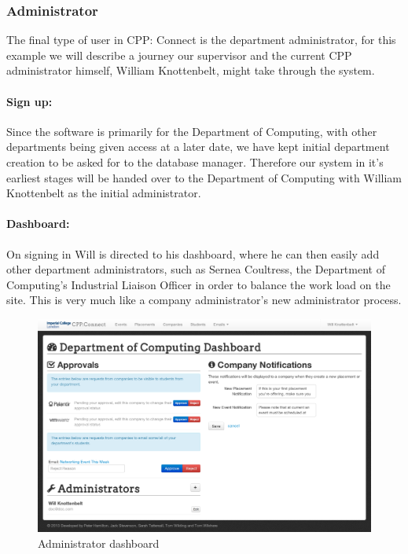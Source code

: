 \subsubsection{Administrator}
  The final type of user in CPP: Connect is the department administrator, for this example we will describe a journey our supervisor and the current CPP administrator himself, William Knottenbelt, might take through the system.
  \paragraph{Sign up:}
    Since the software is primarily for the Department of Computing, with other departments being given access at a later date, we have kept initial department creation to be asked for to the database manager. 
    Therefore our system in it's earliest stages will be handed over to the Department of Computing with William Knottenbelt as the initial administrator.

  \paragraph{Dashboard:}
    On signing in Will is directed to his dashboard, where he can then easily add other department administrators, such as Sernea Coultress, the Department of Computing's Industrial Liaison Officer in order to balance the work load on the site. This is very much like a company administrator's new administrator process.


    \begin{figure}[H]\centering
    \includegraphics[scale=0.3]{images/user_experiences/admin/department_admin_dash}
    \caption{Administrator dashboard}
    \end{figure}

